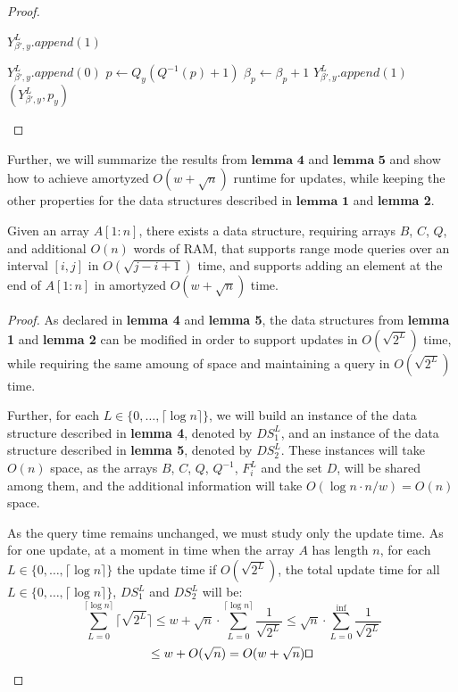 \documentclass[runningheads]{llncs}
\begin{document}
\begin{proof}
\begin{algorithm}[H]
\begin{algorithmic}[1]
                \State $Y_{\beta', y}^L.append(1)$
            \EndFor


                \State $Y_{\beta', y}^L.append(0)$
                \State $p\gets Q_{y}( Q^{-1}(p)+1 )$
                    \State $\beta_p \gets \beta_p+1$
                    \State $Y_{\beta', y}^L.append(1)$
                \EndIf
            \EndWhile
            \Return $(Y_{\beta', y}^L, p_y)$
            \EndFunction
        \end{algorithmic}
    \end{algorithm}

    


\end{proof}

Further, we will summarize the results from $\textbf{lemma 4}$ and $\textbf{lemma 5}$ and show how to achieve amortyzed $O(w+\sqrt{n})$ runtime for updates, while keeping the other properties for the data structures described in $\textbf{lemma 1}$ and \textbf{lemma 2}.
\begin{theorem}
    Given an array $A[1:n]$, there exists a data structure, requiring arrays $B$, $C$, $Q$, and additional $O(n)$ words of RAM, that supports 
    range mode queries over an interval $[i,j]$ in $O(\sqrt{j-i+1})$ time, and supports adding an element at the end of $A[1:n]$ in amortyzed $O(w+\sqrt{n})$ time.
\end{theorem}
\begin{proof}
    As declared in \textbf{lemma 4} and \textbf{lemma 5}, the data structures from \textbf{lemma 1} and \textbf{lemma 2} 
    can be modified in order to support updates in $O(\sqrt{2^L})$ time, 
    while requiring the same amoung of space and maintaining a query in $O(\sqrt{2^L})$ time.
    
    Further, for each $L\in \{0,\dots,\lceil \log n \rceil\}$, we will build an instance of the data structure described in \textbf{lemma 4}, denoted by $DS_1^L$, and an instance of the data structure 
    described in \textbf{lemma 5}, denoted by $DS_2^L$. These instances will take $O(n)$ space, as the arrays $B$, $C$, $Q$, $Q^{-1}$, $F^L_{i}$ and the set $D$, will be shared among them, and the additional information 
    will take $O(\log n \cdot n/w) = O(n)$ space.
    
    As the query time remains unchanged, we must study only the update time. As for one update, at a moment in time when the array $A$ has length $n$, 
    for each $L\in \{0,\dots,\lceil \log n \rceil\}$ the update time if $O(\sqrt{2^L})$, the total update time for all $L\in \{0,\dots,\lceil \log n \rceil\}$, $DS_1^L$ and $DS_2^L$  will be:
    \[
        \sum_{L=0}^{\lceil \log n \rceil}\lceil \sqrt{2^L} \rceil \leq w + \sqrt{n} \cdot \sum_{L=0}^{\lceil \log n \rceil} \frac{1}{\sqrt{2^L}}
        \leq \sqrt{n} \cdot \sum_{L=0}^{\inf} \frac{1}{\sqrt{2^L}}   
     \]
     \[   
        \leq w + O(\sqrt{n}) = O(w+\sqrt{n})  \qed
     \]
\end{proof}
\end{document}
